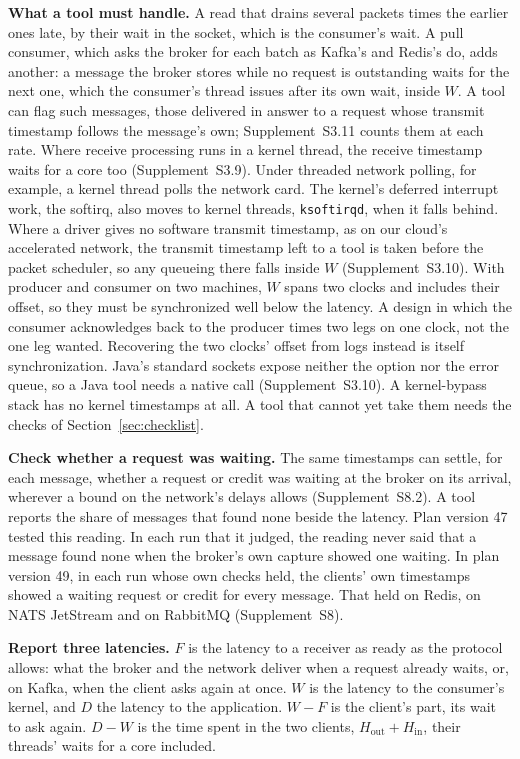 \documentclass[10pt,journal,compsoc]{IEEEtran}
\newcommand{\kafka}{Kafka}
\newcommand{\redis}{Redis}
\begin{document}
\textbf{What a tool must handle.} A read that drains several packets times the earlier ones late,
by their wait in the socket, which is the consumer's wait. A pull consumer, which asks the broker
for each batch as \kafka{}'s and \redis{}'s do, adds another: a message the broker stores while no
request is outstanding waits for the next one, which the consumer's thread issues after its own
wait, inside $W$. A tool can flag such messages, those delivered in answer to a request whose
transmit timestamp follows the message's own; Supplement~S3.11 counts them at each rate. Where
receive processing runs
in a kernel thread, the receive timestamp waits for a core too (Supplement~S3.9). Under
threaded network polling, for example, a kernel thread polls the network card. The kernel's
deferred interrupt work, the softirq, also moves to kernel threads, \texttt{ksoftirqd}, when it
falls behind. Where a driver
gives no software transmit timestamp, as on our cloud's accelerated network, the transmit timestamp left to a tool is taken before the packet scheduler, so any queueing there falls inside $W$ (Supplement~S3.10). With producer
and consumer on two machines, $W$ spans two clocks and includes their offset, so they must be
synchronized well below the latency. A design in which the consumer acknowledges back to the
producer times two legs on one clock, not the one leg wanted. Recovering the two clocks' offset
from logs instead is itself synchronization. Java's standard sockets expose neither the option nor
the error queue, so a Java tool needs a native call (Supplement~S3.10). A kernel-bypass stack
has no kernel timestamps at all. A tool that cannot yet take them needs the checks of
Section~\ref{sec:checklist}.

\textbf{Check whether a request was waiting.} The same timestamps can settle, for each message,
whether a request or credit was waiting at the broker on its arrival, wherever a bound on the
network's delays allows (Supplement~S8.2). A tool reports the share of
messages that found none beside the latency. Plan version 47 tested this reading. In each run that it judged, the reading never said that
a message found none when the broker's own capture showed one waiting.  In plan version 49, in each run whose own checks held, the clients'
own timestamps showed a waiting request or credit for every message. That held on \redis{}, on
NATS JetStream and on RabbitMQ (Supplement~S8).

\textbf{Report three latencies.} $F$ is the latency to a receiver as ready as the protocol
allows: what the broker and the network deliver when a request already waits, or, on \kafka{}, when
the client asks again at once. $W$ is the latency to the consumer's kernel, and $D$
the latency to the application. $W - F$ is the client's part, its wait to ask again. $D - W$ is the
time spent in the two clients, $H_{\mathrm{out}} + H_{\mathrm{in}}$, their threads' waits for a core
included.
\end{document}
